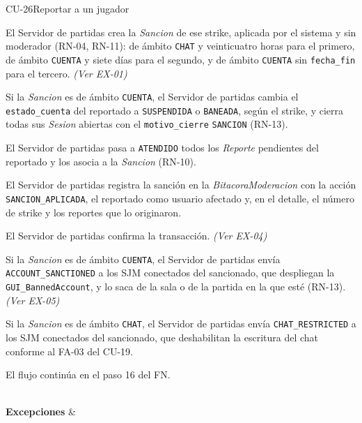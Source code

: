 \begin{fichacu}{CU-26}{Reportar a un jugador}
{\begin{cuenum}[start=1]
      \item El Servidor de partidas crea la \textit{Sancion} de ese strike, aplicada por el sistema y sin moderador (\mbox{RN-04}, \mbox{RN-11}): de ámbito \texttt{CHAT} y veinticuatro horas para el primero, de ámbito \texttt{CUENTA} y siete días para el segundo, y de ámbito \texttt{CUENTA} sin \texttt{fecha\_\allowbreak{}fin} para el tercero. \textit{(Ver \mbox{EX-01})}
      \item Si la \textit{Sancion} es de ámbito \texttt{CUENTA}, el Servidor de partidas cambia el \texttt{estado\_\allowbreak{}cuenta} del reportado a \texttt{SUSPENDIDA} o \texttt{BANEADA}, según el strike, y cierra todas sus \textit{Sesion} abiertas con el \texttt{motivo\_\allowbreak{}cierre} \texttt{SANCION} (\mbox{RN-13}).
      \item El Servidor de partidas pasa a \texttt{ATENDIDO} todos los \textit{Reporte} pendientes del reportado y los asocia a la \textit{Sancion} (\mbox{RN-10}).
      \item El Servidor de partidas registra la sanción en la \textit{BitacoraModeracion} con la acción \texttt{SANCION\_\allowbreak{}APLICADA}, el reportado como usuario afectado y, en el detalle, el número de strike y los reportes que lo originaron.
      \item El Servidor de partidas confirma la transacción. \textit{(Ver \mbox{EX-04})}
      \item Si la \textit{Sancion} es de ámbito \texttt{CUENTA}, el Servidor de partidas envía \texttt{ACCOUNT\_\allowbreak{}SANCTIONED} a los SJM conectados del sancionado, que despliegan la \texttt{GUI\_\allowbreak{}BannedAccount}, y lo saca de la sala o de la partida en la que esté (\mbox{RN-13}). \textit{(Ver \mbox{EX-05})}
      \item Si la \textit{Sancion} es de ámbito \texttt{CHAT}, el Servidor de partidas envía \texttt{CHAT\_\allowbreak{}RESTRICTED} a los SJM conectados del sancionado, que deshabilitan la escritura del chat conforme al \mbox{FA-03} del \mbox{CU-19}.
      \item El flujo continúa en el paso 16 del FN.
    \end{cuenum}} \\ \hline
  \textbf{Excepciones} & 
\end{fichacu}
